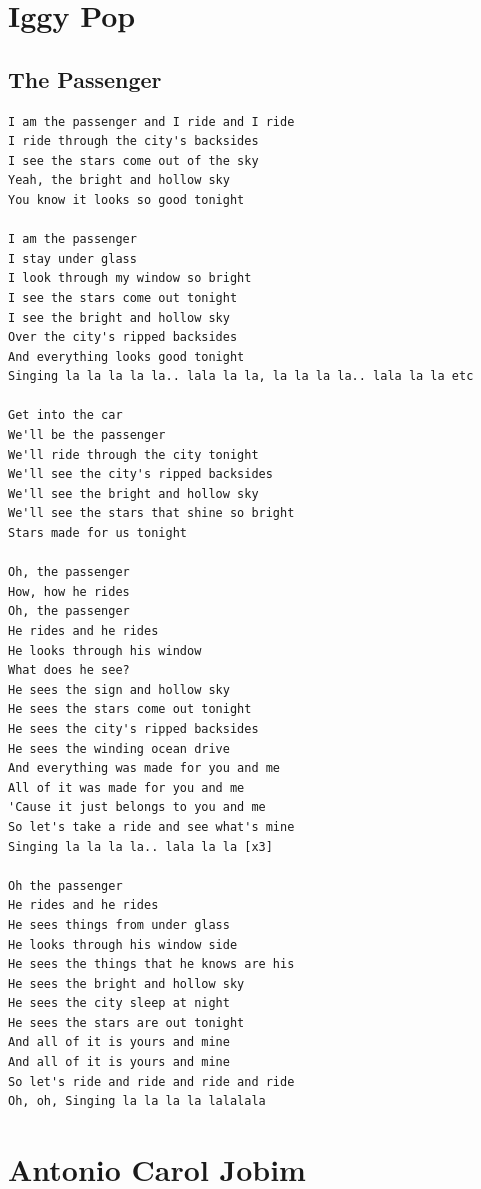 \documentclass[a4paper]{article}
\begin{document}
\section{Iggy Pop}
\subsection{The Passenger}
\begin{Verbatim}[commandchars=\\\{\}]
I am the passenger and I ride and I ride
I ride through the city's backsides
I see the stars come out of the sky
Yeah, the bright and hollow sky
You know it looks so good tonight

I am the passenger
I stay under glass
I look through my window so bright
I see the stars come out tonight
I see the bright and hollow sky
Over the city's ripped backsides
And everything looks good tonight
Singing la la la la la.. lala la la, la la la la.. lala la la etc

Get into the car
We'll be the passenger
We'll ride through the city tonight
We'll see the city's ripped backsides
We'll see the bright and hollow sky
We'll see the stars that shine so bright
Stars made for us tonight

Oh, the passenger
How, how he rides
Oh, the passenger
He rides and he rides
He looks through his window
What does he see?
He sees the sign and hollow sky
He sees the stars come out tonight
He sees the city's ripped backsides
He sees the winding ocean drive
And everything was made for you and me
All of it was made for you and me
'Cause it just belongs to you and me
So let's take a ride and see what's mine
Singing la la la la.. lala la la [x3]

Oh the passenger
He rides and he rides
He sees things from under glass
He looks through his window side
He sees the things that he knows are his
He sees the bright and hollow sky
He sees the city sleep at night
He sees the stars are out tonight
And all of it is yours and mine
And all of it is yours and mine
So let's ride and ride and ride and ride
Oh, oh, Singing la la la la lalalala

\end{Verbatim}
\newpage
\section{Antonio Carol Jobim}
\end{document}
